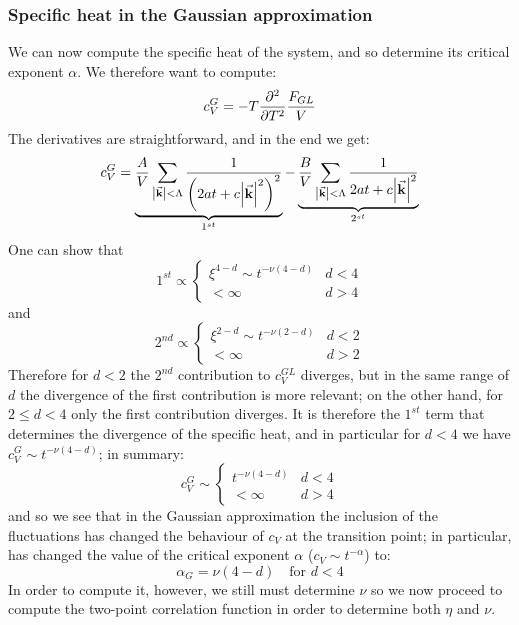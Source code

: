 \documentclass[../../Main/Main.tex]{subfiles}
\begin{document}
\subsubsection{Specific heat in the Gaussian approximation}
We can now compute the specific heat of the system, and so determine its critical exponent \( \alpha  \). We therefore want to compute:
\begin{equation*}
    c_V^{G} = - T \pdv[2]{}{T} \frac{F_{GL}}{V}
\end{equation*}
The derivatives are straightforward, and in the end we get:
\begin{equation*}
  c_V^{G} =   \underbrace{\frac{A}{V} \sum_{\abs{\va{k}} < \Lambda  }^{}
  \frac{1}{ \qty(2 a t + c \abs{\va{k}}^2 )^2}}_{1^{st}}
    - \underbrace{ \frac{B}{V} \sum_{\abs{\va{k}}< \Lambda  }^{} \frac{1}{2 a t + c \abs{\va{k}}^2 }}_{2^{st}}
\end{equation*}
One can show that
\begin{equation*}
1^{st} \propto
  \begin{cases}
   \xi ^{4-d} \sim t^{-\nu (4-d)}  & d < 4\\
  < \infty & d > 4
  \end{cases}
\end{equation*}
and
\begin{equation*}
2^{nd} \propto
  \begin{cases}
   \xi ^{2-d} \sim t^{-\nu (2-d)}  & d < 2\\
  < \infty & d > 2
  \end{cases}
\end{equation*}
Therefore for \( d<2 \) the \( 2^{nd} \)  contribution to \( c_V^{GL} \) diverges, but in the same range of \( d \) the divergence of the first contribution is more relevant; on the other hand, for \( 2 \leq d < 4  \) only the first contribution diverges. It is therefore the \( 1^{st} \) term that determines the divergence of the specific heat, and in particular for \( d<4 \) we have \( c_V^{G}  \sim t^{-\nu (4-d)} \); in summary:
\begin{equation}
  c_V^G \sim \begin{cases}
    t^{-\nu (4-d)} & d < 4 \\
    <\infty & d > 4
\end{cases}
\end{equation}
and so we see that in the Gaussian approximation the inclusion of the fluctuations
has changed the behaviour of \( c_V \) at the transition point; in particular, has changed the value of the critical exponent \( \alpha  \) (\( c_V \sim t^{- \alpha } \)) to:
\begin{equation}
  \alpha_G = \nu (4-d) \quad \text{for } d < 4
\end{equation}
In order to compute it, however, we still must determine \( \nu  \)  so we now proceed to compute the two-point correlation function in order to determine both \( \eta  \) and \( \nu  \).
\end{document}
